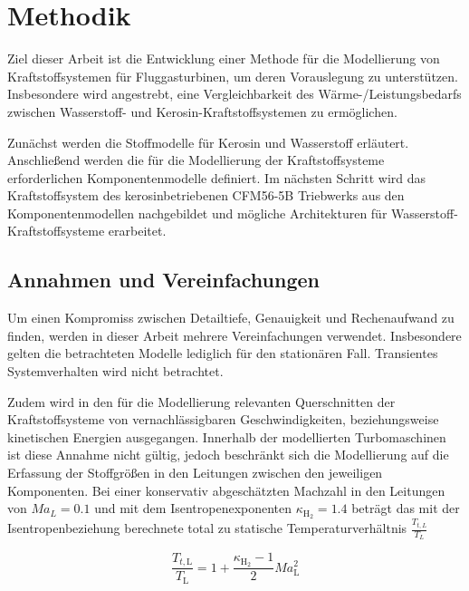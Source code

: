 \chapter{Methodik}
\label{chap:methodik}
Ziel dieser Arbeit ist die Entwicklung einer Methode für die Modellierung von Kraftstoffsystemen für Fluggasturbinen, um deren Vorauslegung zu unterstützen. Insbesondere wird angestrebt, eine Vergleichbarkeit des Wärme-/Leistungsbedarfs zwischen Wasserstoff- und Kerosin-Kraftstoffsystemen zu ermöglichen. 

Zunächst werden die Stoffmodelle für Kerosin und Wasserstoff erläutert. Anschließend werden die für die Modellierung der Kraftstoffsysteme erforderlichen Komponentenmodelle definiert. Im nächsten Schritt wird das Kraftstoffsystem des kerosinbetriebenen CFM56-5B Triebwerks aus den Komponentenmodellen nachgebildet und mögliche Architekturen für Wasserstoff-Kraftstoffsysteme erarbeitet.

\section{Annahmen und Vereinfachungen}

Um einen Kompromiss zwischen Detailtiefe, Genauigkeit und Rechenaufwand zu finden, werden in dieser Arbeit mehrere Vereinfachungen verwendet. Insbesondere gelten die betrachteten Modelle lediglich für den stationären Fall. Transientes Systemverhalten wird nicht betrachtet. 

Zudem wird in den für die Modellierung relevanten Querschnitten der Kraftstoffsysteme von vernachlässigbaren Geschwindigkeiten, beziehungsweise kinetischen Energien ausgegangen. Innerhalb der modellierten Turbomaschinen ist diese Annahme nicht gültig, jedoch beschränkt sich die Modellierung auf die Erfassung der Stoffgrößen in den Leitungen zwischen den jeweiligen Komponenten. Bei einer konservativ abgeschätzten Machzahl in den Leitungen von $Ma_L=0.1$ und mit dem Isentropenexponenten $\kappa_{\mathrm{H}_2} = 1.4$ beträgt das mit der Isentropenbeziehung berechnete total zu statische Temperaturverhältnis  $\frac{T_{t,L}}{T_L}$

\begin{equation}\label{Eq:mach}
	\frac{T_{t,\mathrm{L}}}{T_\mathrm{L}}=1+\frac{\kappa_{\mathrm{H}_2}-1}{2}Ma_\mathrm{L}^2
\end{equation}


